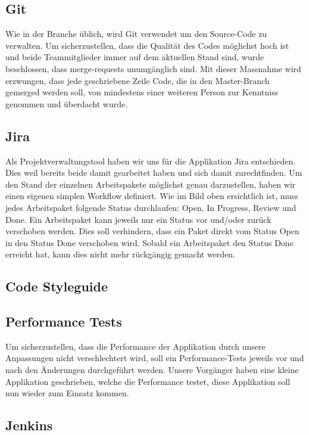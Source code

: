 \subsection{Git}
Wie in der Branche üblich, wird Git verwendet um den Source-Code zu verwalten. Um sicherzustellen, dass die Qualität des Codes möglichst hoch ist und beide Teammitglieder immer auf dem aktuellen Stand sind, wurde beschlossen, dass merge-requests unumgänglich sind. Mit dieser Massnahme wird erzwungen, dass jede geschriebene Zeile Code, die in den Master-Branch gemerged werden soll, von mindestens einer weiteren Person zur Kenntniss genommen und überdacht wurde. 

\subsection{Jira}
Als Projektverwaltungstool haben wir uns für die Applikation Jira entschieden. Dies weil bereits beide damit gearbeitet haben und sich damit zurechtfinden. Um den Stand der einzelnen Arbeitspakete möglichst genau darzustellen, haben wir einen eigenen simplen Workflow definiert. 
Wie im Bild oben ersichtlich ist, muss jedes Arbeitspaket folgende Status durchlaufen: Open, In Progress, Review und Done. Ein Arbeitspaket kann jeweils nur ein Status vor und/oder zurück verschoben werden. Dies soll verhindern, dass ein Paket direkt vom Status Open in den Status Done verschoben wird. Sobald ein Arbeitspaket den Status Done erreicht hat, kann dies nicht mehr rückgängig gemacht werden. 

\subsection{Code Styleguide}

\subsection{Performance Tests}
Um sicherzustellen, dass die Performance der Applikation durch unsere Anpassungen nicht verschlechtert wird, soll ein Performance-Tests jeweils vor und nach den Änderungen durchgeführt werden. Unsere Vorgänger haben eine kleine Applikation geschrieben, welche die Performance testet, diese Applikation soll nun wieder zum Einsatz kommen. 

\subsection{Jenkins}

\newpage